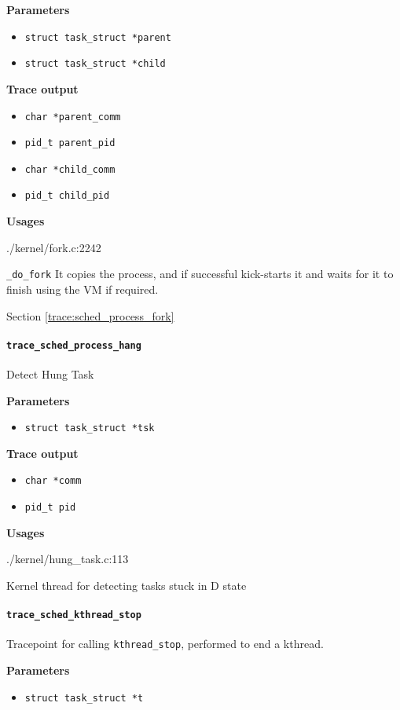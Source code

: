 \textbf{Parameters}
\begin{itemize}
    \item \verb|struct task_struct *parent|
    \item \verb|struct task_struct *child|
\end{itemize}

\textbf{Trace output}
\begin{itemize}
    \item \verb|char *parent_comm|
    \item \verb|pid_t parent_pid|
    \item \verb|char *child_comm|
    \item \verb|pid_t child_pid|
\end{itemize}

\textbf{Usages}
\begin{code}
./kernel/fork.c:2242
\end{code}
\verb|_do_fork|
It copies the process, and if successful kick-starts
it and waits for it to finish using the VM if required.

Section \ref{trace:sched_process_fork}
    
\paragraph{\texttt{trace\_sched\_process\_hang}}
Detect Hung Task

\textbf{Parameters}
\begin{itemize}
    \item \verb|struct task_struct *tsk|
\end{itemize}

\textbf{Trace output}
\begin{itemize}
    \item \verb|char *comm|
    \item \verb|pid_t pid|
\end{itemize}

\textbf{Usages}
\begin{code}
./kernel/hung_task.c:113
\end{code}
Kernel thread for detecting tasks stuck in D state
  
\paragraph{\texttt{trace\_sched\_kthread\_stop}}
Tracepoint for calling \verb|kthread_stop|, performed to end a kthread.

\textbf{Parameters}
\begin{itemize}
    \item \verb|struct task_struct *t|
\end{itemize}

